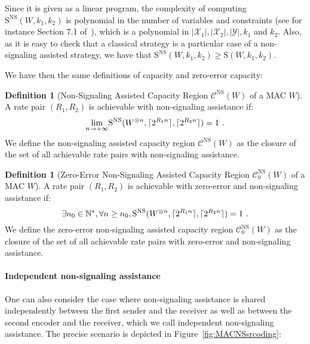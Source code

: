 \documentclass[11pt]{article}
\theoremstyle{definition}
\newtheorem{defi}[theo]{Definition}
\theoremstyle{remark}
\DeclarePairedDelimiter\ceil{\lceil}{\rceil}
\begin{document}
Since it is given as a linear program, the complexity of computing $\mathrm{S}^{\mathrm{NS}}(W,k_1,k_2)$ is polynomial in the number of variables and constraints (see for instance Section 7.1 of~\cite{GM07}), which is a polynomial in $|\mathcal{X}_1|,|\mathcal{X}_2|,|\mathcal{Y}|,k_1$ and $k_2$. Also, as it is easy to check that a classical strategy is a particular case of a non-signaling assisted strategy, we have that $\mathrm{S}^{\mathrm{NS}}(W,k_1,k_2) \geq \mathrm{S}(W,k_1,k_2)$.

We have then the same definitions of capacity and zero-error capacity:
\begin{defi}[Non-Signaling Assisted Capacity Region $\mathcal{C}^{\mathrm{NS}}(W)$ of a MAC $W$]
  A rate pair $(R_1,R_2)$ is achievable with non-signaling assistance if:
  \[ \underset{n \rightarrow +\infty}{\lim} \mathrm{S}^{\mathrm{NS}}(W^{\otimes n},\ceil{2^{R_1n}},\ceil{2^{R_2n}}) = 1 \ . \]
  We define the non-signaling assisted capacity region $\mathcal{C}^{\mathrm{NS}}(W)$ as the closure of the set of all achievable rate pairs with non-signaling assistance.
\end{defi}

\begin{defi}[Zero-Error Non-Signaling Assisted Capacity Region $\mathcal{C}^{\mathrm{NS}}_0(W)$ of a MAC $W$]
  A rate pair $(R_1,R_2)$ is achievable with zero-error and non-signaling assistance if:
  \[ \exists n_0 \in \mathbb{N}^*, \forall n \geq n_0, \mathrm{S}^{\mathrm{NS}}(W^{\otimes n},\ceil{2^{R_1n}},\ceil{2^{R_2n}}) = 1 \ . \]
  We define the zero-error non-signaling assisted capacity region $\mathcal{C}^{\mathrm{NS}}_0(W)$ as the closure of the set of all achievable rate pairs with zero-error and non-signaling assistance.
\end{defi}

\paragraph{Independent non-signaling assistance} One can also consider the case where non-signaling assistance is shared independently between the first sender and the receiver as well as between the second encoder and the receiver, which we call independent non-signaling assistance. The precise scenario is depicted in Figure~\ref{fig:MACNSsrcoding}:
\end{document}
